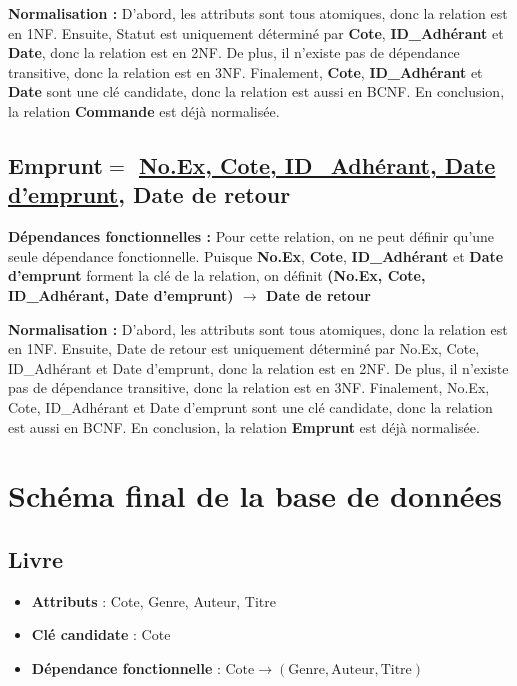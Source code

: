 \documentclass[12pt]{article}
\begin{document}
\textbf{Normalisation :} D'abord, les attributs sont tous atomiques, donc la relation est en 1NF. 
Ensuite, Statut est uniquement déterminé  par  \textbf{Cote},\textbf{ ID\_Adhérant} et \textbf{Date}, 
donc la relation est en 2NF. De plus, il n’existe pas de dépendance transitive, donc la relation est en 3NF. 
Finalement, \textbf{Cote}, \textbf{ID\_Adhérant} et \textbf{Date} sont une clé candidate, 
donc la relation est aussi en BCNF. En conclusion, la relation \textbf{Commande} est déjà normalisée.

\subsection*{\textbf{Emprunt}$=$ \underline{No.Ex, Cote, ID\_Adhérant, Date d'emprunt}, Date de retour}

\textbf{Dépendances fonctionnelles :} Pour cette relation, on ne peut définir qu'une seule dépendance fonctionnelle. Puisque 
\textbf{No.Ex}, \textbf{Cote},\textbf{ ID\_Adhérant} et\textbf{ Date d'emprunt} forment la clé de la relation, 
on définit \textbf{(No.Ex, Cote, ID\_Adhérant, Date d'emprunt) $\rightarrow$ Date de retour} 

\textbf{Normalisation :} D'abord, les attributs sont tous atomiques, donc la relation est en 1NF. 
Ensuite, Date de retour est uniquement déterminé  par  No.Ex, Cote, ID\_Adhérant et Date d'emprunt, 
donc la relation est en 2NF. De plus, il n’existe pas de dépendance transitive, donc la relation est en 3NF. 
Finalement, No.Ex, Cote, ID\_Adhérant et Date d'emprunt sont une clé candidate, donc la relation est aussi en BCNF. 
En conclusion, la relation \textbf{Emprunt} est déjà normalisée.


\section*{Schéma final de la base de données}

\subsection*{Livre}
\begin{itemize}
    \item \textbf{Attributs} : Cote, Genre, Auteur, Titre
    \item \textbf{Clé candidate} : Cote
    \item \textbf{Dépendance fonctionnelle} : \( \text{Cote} \rightarrow (\text{Genre}, \text{Auteur}, \text{Titre}) \)
\end{itemize}
\end{document}
